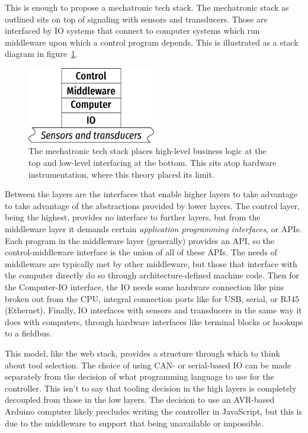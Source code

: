 \documentclass[english,12pt,a4paper,pdftex,eng,utf8]{aaltothesis}
\begin{document}
This is enough to propose a mechatronic tech stack.  The mechatronic stack as outlined sits on top of signaling with sensors and transducers.  Those are interfaced by IO systems that connect to computer systems which run middleware upon which a control program depends.  This is illustrated as a stack diagram in figure~\ref{fig:mechatronic_tech_stack}.

\begin{figure}[h]
  \centering
  \includegraphics[width=0.5\textwidth]{assets/mechatronic_tech_stack}
  \caption{The mechatronic tech stack places high-level business logic at the top and low-level interfacing at the bottom.  This sits atop hardware instrumentation, where this theory placed its limit.}\label{fig:mechatronic_tech_stack}
\end{figure}

Between the layers are the interfaces that enable higher layers to take advantage to take advantage of the abstractions provided by lower layers.  The control layer, being the highest, provides no interface to further layers, but from the middleware layer it demands certain {\it application programming interfaces}, or APIs.  Each program in the middleware layer (generally) provides an API, so the control-middleware interface is the union of all of these APIs.  The needs of middleware are typically met by other middleware, but those that interface with the computer directly do so through architecture-defined machine code.  Then for the Computer-IO interface, the IO needs some hardware connection like pins broken out from the CPU, integral connection ports like for USB, serial, or RJ45 (Ethernet).  Finally, IO interfaces with sensors and transducers in the same way it does with computers, through hardware interfaces like terminal blocks or hookups to a fieldbus.

This model, like the web stack, provides a structure through which to think about tool selection.  The choice of using CAN- or serial-based IO can be made separately from the decision of what programming language to use for the controller.  This isn't to say that tooling decision in the high layers is completely decoupled from those in the low layers.  The decision to use an AVR-based Arduino computer likely precludes writing the controller in JavaScript, but this is due to the middleware to support that being unavailable or impossible.
\end{document}

